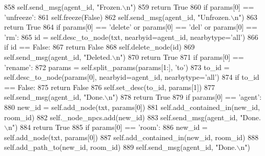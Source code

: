 \begin{DoxyCode}
858             self.send\_msg(agent\_id, \textcolor{stringliteral}{"Frozen.\(\backslash\)n"})
859             \textcolor{keywordflow}{return} \textcolor{keyword}{True}
860         \textcolor{keywordflow}{if} params[0] == \textcolor{stringliteral}{'unfreeze'}:
861             self.freeze(\textcolor{keyword}{False})
862             self.send\_msg(agent\_id, \textcolor{stringliteral}{"Unfrozen.\(\backslash\)n"})
863             \textcolor{keywordflow}{return} \textcolor{keyword}{True}
864         \textcolor{keywordflow}{if} params[0] == \textcolor{stringliteral}{'delete'} \textcolor{keywordflow}{or} params[0] == \textcolor{stringliteral}{'del'} \textcolor{keywordflow}{or} params[0] == \textcolor{stringliteral}{'rm'}:
865             id = self.desc\_to\_node(txt, nearbyid=agent\_id, nearbytype=\textcolor{stringliteral}{'all'})
866             \textcolor{keywordflow}{if} id == \textcolor{keyword}{False}:
867                 \textcolor{keywordflow}{return} \textcolor{keyword}{False}
868             self.delete\_node(id)
869             self.send\_msg(agent\_id, \textcolor{stringliteral}{"Deleted.\(\backslash\)n"})
870             \textcolor{keywordflow}{return} \textcolor{keyword}{True}
871         \textcolor{keywordflow}{if} params[0] == \textcolor{stringliteral}{'rename'}:
872             params = self.split\_params(params[1:], \textcolor{stringliteral}{'to'})
873             to\_id = self.desc\_to\_node(params[0], nearbyid=agent\_id, nearbytype=\textcolor{stringliteral}{'all'})
874             \textcolor{keywordflow}{if} to\_id == \textcolor{keyword}{False}:
875                 \textcolor{keywordflow}{return} \textcolor{keyword}{False}
876             self.set\_desc(to\_id, params[1])
877             self.send\_msg(agent\_id, \textcolor{stringliteral}{"Done.\(\backslash\)n"})
878             \textcolor{keywordflow}{return} \textcolor{keyword}{True}
879         \textcolor{keywordflow}{if} params[0] == \textcolor{stringliteral}{'agent'}:
880             new\_id = self.add\_node(txt, params[0])
881             self.add\_contained\_in(new\_id, room\_id)
882             self.\_node\_npcs.add(new\_id)
883             self.send\_msg(agent\_id, \textcolor{stringliteral}{"Done.\(\backslash\)n"})
884             \textcolor{keywordflow}{return} \textcolor{keyword}{True}
885         \textcolor{keywordflow}{if} params[0] == \textcolor{stringliteral}{'room'}:
886             new\_id = self.add\_node(txt, params[0])
887             self.add\_contained\_in(new\_id, room\_id)
888             self.add\_path\_to(new\_id, room\_id)
889             self.send\_msg(agent\_id, \textcolor{stringliteral}{"Done.\(\backslash\)n"})

\end{DoxyCode}
